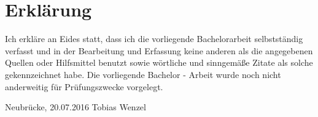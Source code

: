 


\newpage{}
\chapter*{Erklärung}

Ich erkläre an Eides statt, dass ich die vorliegende Bachelorarbeit selbstständig verfasst und in der Bearbeitung und Erfassung keine anderen als die angegebenen Quellen oder Hilfsmittel benutzt sowie wörtliche und sinngemäße Zitate als solche gekennzeichnet habe. Die vorliegende Bachelor - Arbeit wurde noch nicht anderweitig für Prüfungszwecke vorgelegt.

\vspace{3cm}
Neubrücke, 20.07.2016 \hspace{5cm} Tobias Wenzel\\
